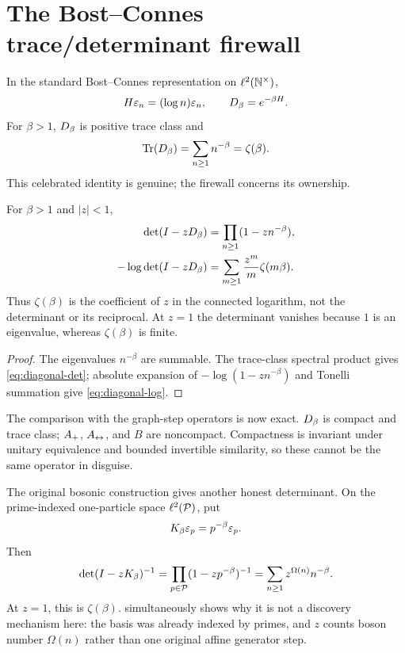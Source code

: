 \section{The Bost--Connes trace/determinant firewall}
\label{sec:bc-firewall}

In the standard Bost--Connes representation on $\ell^2(\mathbb N^{\times})$,
\[
H\varepsilon_n=(\log n)\varepsilon_n,
\qquad D_{\beta}=e^{-\beta H}.
\]
For $\beta>1$, $D_{\beta}$ is positive trace class and
\begin{equation}
\operatorname{Tr}(D_{\beta})=\sum_{n\ge1}n^{-\beta}=\zeta(\beta).
\label{eq:partition-trace}
\end{equation}
This celebrated identity is genuine; the firewall concerns its ownership.

\begin{theorem}
\label{thm:bc-determinant}
For $\beta>1$ and $|z|<1$,
\begin{align}
\det(I-zD_{\beta})
 &=\prod_{n\ge1}(1-zn^{-\beta}),
\label{eq:diagonal-det}\\
-\log\det(I-zD_{\beta})
 &=\sum_{m\ge1}\frac{z^m}{m}\zeta(m\beta).
\label{eq:diagonal-log}
\end{align}
Thus $\zeta(\beta)$ is the coefficient of $z$ in the connected logarithm,
not the determinant or its reciprocal.  At $z=1$ the determinant vanishes
because $1$ is an eigenvalue, whereas $\zeta(\beta)$ is finite.
\end{theorem}

\begin{proof}
The eigenvalues $n^{-\beta}$ are summable.  The trace-class spectral product
gives \cref{eq:diagonal-det}; absolute expansion of
$-\log(1-zn^{-\beta})$ and Tonelli summation give
\cref{eq:diagonal-log}.
\end{proof}

The comparison with the graph-step operators is now exact.  $D_{\beta}$ is
compact and trace class; $A_{+}$, $A_{\leftrightarrow}$, and $B$ are noncompact.  Compactness
is invariant under unitary equivalence and bounded invertible similarity, so
these cannot be the same operator in disguise.

The original bosonic construction gives another honest determinant.  On the
prime-indexed one-particle space $\ell^2(\mathcal P)$, put
\[
K_{\beta}\varepsilon_p=p^{-\beta}\varepsilon_p.
\]
Then
\begin{equation}
\det(I-zK_{\beta})^{-1}
=\prod_{p\in\mathcal P}(1-zp^{-\beta})^{-1}
=\sum_{n\ge1}z^{\Omega(n)}n^{-\beta}.
\label{eq:bosonic-det}
\end{equation}
At $z=1$, this is $\zeta(\beta)$.   simultaneously
shows why it is not a discovery
mechanism here: the basis was already indexed by primes, and $z$ counts
boson number $\Omega(n)$ rather than one original affine generator step.

